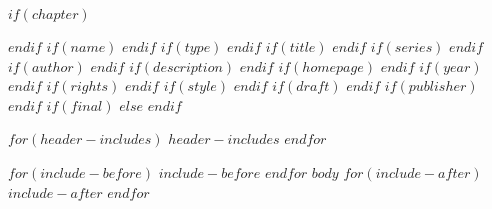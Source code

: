 $if(chapter)$
\setcounter{chapter}{$chapter$}
\addtocounter{chapter}{-1}
$endif$
$if(name)$
\renewcommand{\bookgenname}{$name$}
$endif$
$if(type)$
\renewcommand{\bookgentype}{$type$}
$endif$
$if(title)$
\renewcommand{\titleinfo}{$title$}
$endif$
$if(series)$
\renewcommand{\seriesinfo}{$series$}
$endif$
$if(author)$
\renewcommand{\authorinfo}{$author$}
$endif$
$if(description)$
\renewcommand{\descriptioninfo}{$description$}
$endif$
$if(homepage)$
\renewcommand{\homepageinfo}{$homepage$}
$endif$
$if(year)$
\renewcommand{\yearinfo}{$year$}
$endif$
$if(rights)$
\renewcommand{\rightsinfo}{$rights$}
$endif$
$if(style)$
\renewcommand{\styleinfo}{$style$}
$endif$
$if(draft)$
\renewcommand{\draftinfo}{$draft$}
$endif$
$if(publisher)$
\renewcommand{\publisherinfo}{$publisher$}
$endif$
$if(final)$
\DraftOff
$else$
\DraftOn
$endif$

$for(header-includes)$
$header-includes$
$endfor$

$for(include-before)$
$include-before$
$endfor$
$body$
$for(include-after)$
$include-after$
$endfor$
